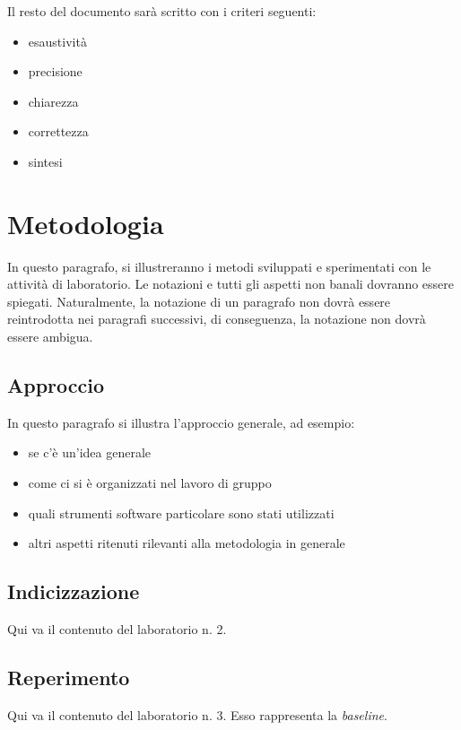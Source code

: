 \documentclass{llncs}
\begin{document}
Il resto del documento sar\`a scritto con i criteri seguenti:
\begin{itemize}
\item esaustivit\`a
\item precisione
\item chiarezza
\item correttezza
\item sintesi
\end{itemize}

\section{Metodologia}
\label{sec:metodologia}

In questo paragrafo, si illustreranno i metodi sviluppati e sperimentati con le
attivit\`a di laboratorio. Le notazioni e tutti gli aspetti non banali dovranno
essere spiegati. Naturalmente, la notazione di un paragrafo non dovr\`a essere
reintrodotta nei paragrafi successivi, di conseguenza, la notazione non dovr\`a
essere ambigua.

\subsection{Approccio}
\label{sec:approccio}

In questo paragrafo si illustra l'approccio generale, ad esempio:
\begin{itemize}
\item se c'\`e un'idea generale
\item come ci si \`e organizzati nel lavoro di gruppo
\item quali strumenti software particolare sono stati utilizzati
\item altri
  aspetti ritenuti rilevanti alla metodologia in generale 
\end{itemize}

\subsection{Indicizzazione} \label{sec:metodi-di-indic}

Qui va il contenuto del laboratorio n. 2.

\subsection{Reperimento}
\label{sec:metodi-di-reper}

Qui va il contenuto del laboratorio n. 3. Esso rappresenta la \textit{baseline}.
\end{document}
